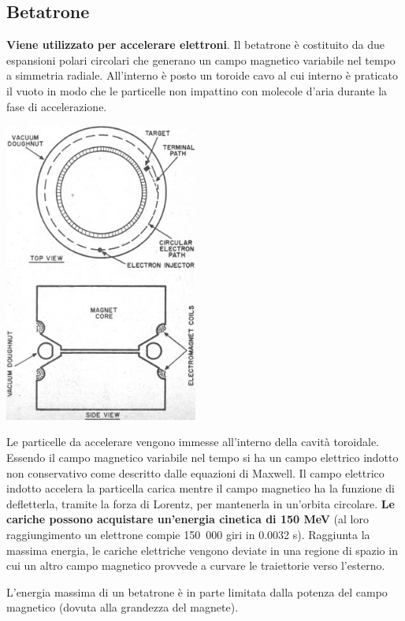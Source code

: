 \documentclass[a4paper,11pt,twoside,openany]{book}
\theoremstyle{definition}
\theoremstyle{plain}
\theoremstyle{plain}
\theoremstyle{definition}
\begin{document}
\subsection{Betatrone} %
\textbf{Viene utilizzato per accelerare elettroni}. Il betatrone è costituito da due espansioni polari circolari che generano un campo magnetico variabile nel tempo a simmetria radiale. All'interno è posto un toroide cavo al cui interno è praticato il vuoto in modo che le particelle non impattino con molecole d'aria durante la fase di accelerazione.

\begin{center}
\includegraphics[width=2.5in]{immagini/betatron.jpg} %
\end{center}

Le particelle da accelerare vengono immesse all'interno della cavità toroidale. Essendo il campo magnetico variabile nel tempo si ha un campo elettrico indotto non conservativo come descritto dalle equazioni di Maxwell. Il campo elettrico indotto accelera la particella carica mentre il campo magnetico ha la funzione di defletterla, tramite la forza di Lorentz, per mantenerla in un'orbita circolare. \textbf{Le cariche possono acquistare un'energia cinetica di 150 MeV} (al loro raggiungimento un elettrone compie \si{150.000} giri in 0.0032 s). Raggiunta la massima energia, le cariche elettriche vengono deviate in una regione di spazio in cui un altro campo magnetico provvede a curvare le traiettorie verso l'esterno.

L'energia massima di un betatrone è in parte limitata dalla potenza del campo magnetico (dovuta alla grandezza del magnete).
\end{document}
